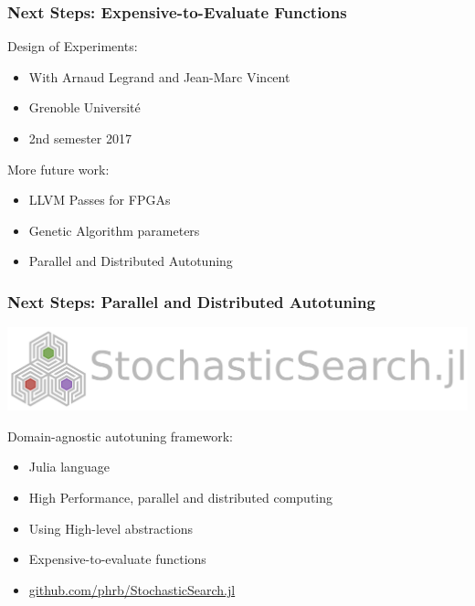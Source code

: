 \documentclass[10pt, compress, aspectratio=169]{beamer}
\begin{document}
\begin{frame}
    \frametitle{Next Steps: Expensive-to-Evaluate Functions}
    \alert{Design of Experiments}:
    \begin{itemize}
        \item With Arnaud Legrand and Jean-Marc Vincent
        \item Grenoble Université
        \item 2nd semester 2017
    \end{itemize}

    More future work:
    \begin{itemize}
        \item LLVM Passes for FPGAs
        \item Genetic Algorithm parameters
        \item Parallel and Distributed Autotuning
    \end{itemize}
\end{frame}

\begin{frame}
    \frametitle{Next Steps: Parallel and Distributed Autotuning}
    \begin{center}
        \includegraphics[width=.75\textwidth]{stochasticsearch_logo}
    \end{center}

    Domain-agnostic autotuning framework:
    \begin{itemize}
        \item \alert{Julia} language
        \item \alert{High Performance}, \alert{parallel and distributed computing}
        \item Using \alert{High-level abstractions}
        \item \alert{Expensive-to-evaluate} functions
        \item \url{github.com/phrb/StochasticSearch.jl}
    \end{itemize}
\end{frame}

\maketitle
\end{document}
